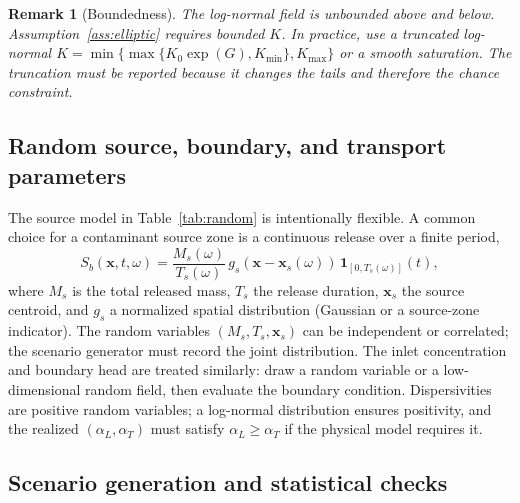 \documentclass[11pt]{article}
\numberwithin{equation}{section}
\newcommand{\xx}{\mathbf{x}}
\newcommand{\ind}{\mathbf{1}}
\theoremstyle{plain}
\newtheorem{remark}{Remark}
\begin{document}
\begin{remark}[Boundedness]
The log-normal field is unbounded above and below.  Assumption~\ref{ass:elliptic}
requires bounded $K$.  In practice, use a truncated log-normal
$K=\min\{\max\{K_0\exp(G),K_{\min}\},K_{\max}\}$ or a smooth saturation.  The
truncation must be reported because it changes the tails and therefore the
chance constraint.
\end{remark}

\subsection{Random source, boundary, and transport parameters}

The source model in Table~\ref{tab:random} is intentionally flexible.  A
common choice for a contaminant source zone is a continuous release over a
finite period,
\begin{equation}
\label{eq:source}
S_b(\xx,t,\omega)
=\frac{M_s(\omega)}{T_s(\omega)}\,g_s(\xx-\xx_s(\omega))\,
\ind_{[0,T_s(\omega)]}(t),
\end{equation}
where $M_s$ is the total released mass, $T_s$ the release duration,
$\xx_s$ the source centroid, and $g_s$ a normalized spatial distribution
(Gaussian or a source-zone indicator).  The random variables
$(M_s,T_s,\xx_s)$ can be independent or correlated; the scenario generator
must record the joint distribution.  The inlet concentration and boundary head
are treated similarly: draw a random variable or a low-dimensional random
field, then evaluate the boundary condition.  Dispersivities are positive
random variables; a log-normal distribution ensures positivity, and the
realized $(\alpha_L,\alpha_T)$ must satisfy $\alpha_L\ge\alpha_T$ if the
physical model requires it.

\subsection{Scenario generation and statistical checks}
\end{document}
